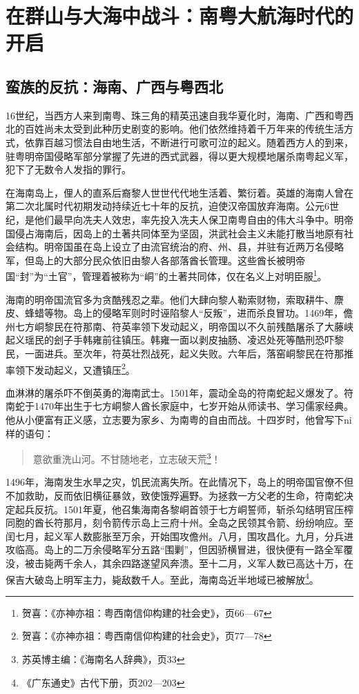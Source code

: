 \chapter{在群山与大海中战斗：南粤大航海时代的开启}

\section{蛮族的反抗：海南、广西与粤西北}

\indent 16世纪，当西方人来到南粤、珠三角的精英迅速自我华夏化时，海南、广西和粤西北的百姓尚未太受到此种历史剧变的影响。他们依然维持着千万年来的传统生活方式，依靠百越习惯法自由地生活，不断进行可歌可泣的起义。随着西方人的到来，驻粤明帝国侵略军部分掌握了先进的西式武器，得以更大规模地屠杀南粤起义军，犯下了无数令人发指的罪行。

在海南岛上，俚人的直系后裔黎人世世代代地生活着、繁衍着。英雄的海南人曾在第二次北属时代初期发动持续近七十年的反抗，迫使汉帝国放弃海南。公元6世纪，是他们最早向冼夫人效忠，率先投入冼夫人保卫南粤自由的伟大斗争中。明帝国侵占海南后，因岛上的土著共同体至为坚固，洪武社会主义未能打散当地原有社会结构。明帝国虽在岛上设立了由流官统治的府、州、县，并驻有近两万名侵略军，但岛上的大部分民众依旧由黎人各部落酋长管理。这些酋长被明帝国“封”为“土官”，管理着被称为“峒”的土著共同体，仅在名义上对明臣服\footnote{贺喜：《亦神亦祖：粤西南信仰构建的社会史》，页66—67}。

海南的明帝国流官多为贪酷残忍之辈。他们大肆向黎人勒索财物，索取耕牛、麖皮、蜂蜡等物。岛上的侵略军则时时诬陷黎人“反叛”，进而杀良冒功。1469年，儋州七方峒黎民在符那南、符英率领下发动起义，明帝国以不久前残酷屠杀了大藤峡起义瑶民的刽子手韩雍前往镇压。韩雍一面以剥皮抽肠、凌迟处死等酷刑恐吓黎民，一面进兵。至次年，符英壮烈战死，起义失败。六年后，落窑峒黎民在符那推率领下发动起义，又遭镇压\footnote{贺喜：《亦神亦祖：粤西南信仰构建的社会史》，页77—78}。

血淋淋的屠杀吓不倒英勇的海南武士。1501年，震动全岛的符南蛇起义爆发了。符南蛇于1470年出生于七方峒黎人酋长家庭中，七岁开始从师读书、学习儒家经典。他从小便富有正义感，立志要为家乡、为南粤的自由而战。十四岁时，他曾写下ni 样的语句：

\begin{quote}

意欲重洗山河。不甘随地老，立志破天荒\footnote{苏英博主编：《海南名人辞典》，页33}！

\end{quote}

1496年，海南发生水旱之灾，饥民流离失所。在此情况下，岛上的明帝国官僚不但不加救助，反而依旧横征暴敛，致使饿殍遍野。为拯救一方父老的生命，符南蛇决定起兵反抗。1501年夏，他召集海南各黎峒首领于七方峒誓师，斩杀勾结明官压榨同胞的酋长符那月，刻令箭传示岛上三府十州。全岛之民领其令箭、纷纷响应。至闰七月，起义军人数膨胀至万余，开始围攻儋州。八月，围攻昌化。九月，分兵进攻临高。岛上的二万余侵略军分五路“围剿”，但因骄横冒进，很快便有一路全军覆没，被击毙两千余人，其余四路遂望风奔溃。至十二月，义军人数已高达十万，在保吉大破岛上明军主力，毙敌数千人。至此，海南岛近半地域已被解放\footnote{《广东通史》古代下册，页202—203}。

